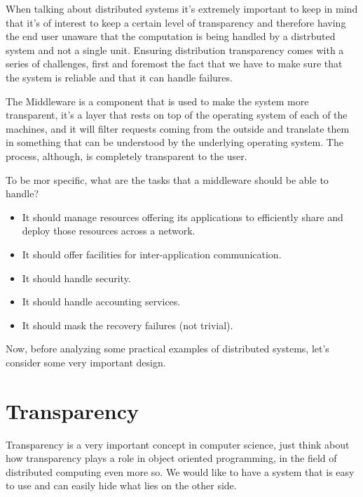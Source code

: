 When talking about distributed systems it's extremely important to keep in mind that it's of
interest to keep a certain level of transparency and therefore having the end user unaware that the
computation is being handled by a distrbuted system and not a single unit. Ensuring distribution
transparency comes with a series of challenges, first and foremost the fact that we have to make sure that the system is reliable and that it can handle failures.

The Middleware is a component that is used to make the system more transparent, it's a layer that rests on top of the operating system of each of the machines, and it will filter requests coming from the outside and translate them in something that can be understood by the underlying operating system. The process, although, is completely transparent to the user.

To be mor specific, what are the tasks that a middleware should be able to handle?
\begin{itemize}
	\item It should manage resources offering its applications to efficiently share and deploy those resources across a network.
	\item It should offer facilities for inter-application communication.
	\item It should handle security.
	\item It should handle accounting services.
	\item It should mask the recovery failures (not trivial).
\end{itemize}
Now, before analyzing some practical examples of distributed systems, let's consider some very
important design.

\section{Transparency}
Transparency is a very important concept in computer science, just think about how transparency plays a role in object oriented programming, in the field of distributed computing even more so. We would like to have a system that is easy to use and can easily hide what lies on the other side.

